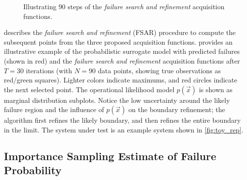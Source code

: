 \begin{figure}[b!]
    \centering
    
    \caption{Illustrating $90$ steps of the \textit{failure search and refinement} acquisition functions.}
    \label{fig:fsar_toy}
\end{figure}

 describes the \textit{failure search and refinement} (FSAR) procedure to compute the subsequent points from the three proposed acquisition functions.  provides an illustrative example of the probabilistic surrogate model with predicted failures (shown in red) and the \textit{failure search and refinement} acquisition functions after $T=\num{30}$ iterations (with $N=\num{90}$ data points, showing true observations as red/green squares).
Lighter colors indicate maximums, and red circles indicate the next selected point.
The operational likelihood model $p(\vec{x})$ is shown as marginal distribution subplots.
Notice the low uncertainty around the likely failure region and the influence of $p(\vec{x})$ on the boundary refinement; the algorithm first refines the likely boundary, and then refines the entire boundary in the limit. The system under test is an example system shown in \cref{fig:toy_rep}.



\subsection{Importance Sampling Estimate of Failure Probability}\label{sec:is}

